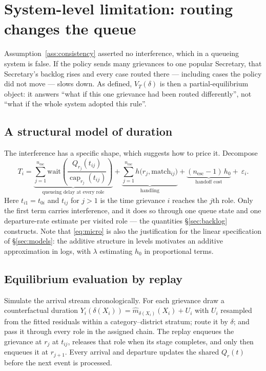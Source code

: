 \documentclass[11pt,a4paper]{article}
\theoremstyle{plain}
\theoremstyle{definition}
\theoremstyle{remark}
\begin{document}
\section{System-level limitation: routing changes the queue}\label{sec:interfere}

Assumption~\ref{ass:consistency} asserted no interference, which in a queueing system is false.
If the policy sends many grievances to one popular Secretary, that Secretary's backlog rises and
every case routed there --- including cases the policy did not move --- slows down. As defined,
$V_T(\delta)$ is then a partial-equilibrium object: it answers ``what if this one grievance had
been routed differently'', not ``what if the whole system adopted this rule''.

\subsection{A structural model of duration}\label{sec:micro}

The interference has a specific shape, which suggests how to price it. Decompose
\begin{equation}
T_i=\underbrace{\sum_{j=1}^{n_{\text{esc}}}
\text{wait}\!\left(\frac{Q_{r_j}(t_{ij})}{\operatorname{cap}_{r_j}(t_{ij})}\right)}_{\text{queueing delay at every role}}
+\underbrace{\sum_{j=1}^{n_{\text{esc}}}h\bigl(r_j,\text{match}_{ij}\bigr)}_{\text{handling}}
+\underbrace{(n_{\text{esc}}-1)\,h_0}_{\text{handoff cost}}
+\ \varepsilon_i .
\label{eq:micro}
\end{equation}
Here $t_{i1}=t_{0i}$ and $t_{ij}$ for $j>1$ is the time grievance $i$ reaches the $j$th role.
Only the first term carries interference, and it does so through one queue state and one
departure-rate estimate per visited role --- the quantities \S\ref{sec:backlog} constructs.
Note that \eqref{eq:micro} is
also the justification for the linear specification of \S\ref{sec:models}: the additive
structure in levels motivates an additive approximation in logs, with $\lambda$ estimating $h_0$
in proportional terms.

\subsection{Equilibrium evaluation by replay}

Simulate the arrival stream chronologically. For each grievance draw a counterfactual duration
$Y_i(\delta(X_i))=\hat m_{\delta(X_i)}(X_i)+U_i$ with $U_i$ resampled from the fitted residuals
within a category--district stratum; route it by $\delta$; and pass it through every role in the
assigned chain. The replay enqueues the grievance at $r_j$ at $t_{ij}$, releases that role when
its stage completes, and only then enqueues it at $r_{j+1}$. Every arrival and departure updates
the shared $Q_r(t)$ before the next event is processed.
\end{document}
